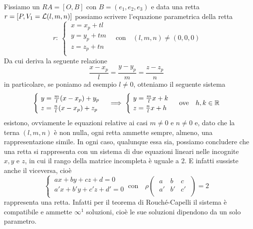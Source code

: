Fissiamo un \(RA = [O, B]\) con \(B = (e_1, e_2, e_3)\) e data una retta \(r = [P, V_1=\mathcal{L}(l,m,n) ]\) possiamo scrivere l'equazione parametrica della retta \[
r : \
\begin{cases}
    \ x = x_p + tl \\
    \ y = y_p + tm \\
    \ z = z_p + tn \\
\end{cases} \quad \text{con}\quad (l,m,n) \neq (0,0,0)
\] Da cui deriva la seguente relazione \[
\frac{x-x_p}{l} = \frac{y-y_p}{m} = \frac{z - z_p}{n}
\] in particolare, se poniamo ad esempio \(l \neq 0\), otteniamo il seguente sistema \[
\begin{cases}
    \ y = \frac{m}{l} (x-x_p) + y_p \\
    \ z = \frac{n}{l} (x-x_p) + z_p \\
\end{cases} \implies 
\begin{cases}
    \ y = \frac{m}{l} x + k \\
    \ z = \frac{n}{l} x + h \\
\end{cases} \ \text{ove} \quad h, k \in \RR 
\] esistono, ovviamente le equazioni relative ai casi \(m \neq 0\) e \(n \neq 0\) e, dato che la terna \((l,m,n)\) è non nulla, ogni retta ammette sempre, almeno, una rappresentazione simile. In ogni caso, qualunque essa sia, possiamo concludere che una retta si rappresenta con un sistema di due equazioni lineari nelle incognite \(x, y\) e \(z\), in cui il rango della matrice incompleta è uguale a 2. E infatti sussiste anche il viceversa, cioè \[
\begin{cases}
    \ ax + by + cz + d = 0 \\
    \ a'x + b'y + c'z + d' = 0 \\
\end{cases} \ \text{con} \quad \rho
\left( \; \begin{matrix}
    a & b & c \\
    a' & b' & c' \\
\end{matrix} \; \right) = 2
\] rappresenta una retta. Infatti per il teorema di Rouché-Capelli il sistema è compatibile e ammette \(\infty^{1}\) soluzioni, cioè le sue soluzioni dipendono da un solo parametro.  

